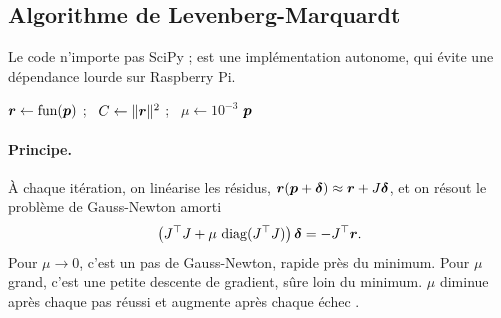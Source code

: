 \subsection{Algorithme de Levenberg-Marquardt}

Le code n'importe pas SciPy ;  est une implémentation autonome, qui évite une dépendance lourde sur Raspberry Pi.

\begin{algorithm}[H]
\caption{}
$\bm{r} \leftarrow \text{fun}(\bm{p})$ ; \ $C \leftarrow \|\bm{r}\|^2$ ; \ $\mu \leftarrow 10^{-3}$\;
\Return $\bm{p}$
\end{algorithm}

\paragraph{Principe.} À chaque itération, on linéarise les résidus, $\bm{r}(\bm{p} + \bm{\delta}) \approx \bm{r} + J\bm{\delta}$, et on résout le problème de Gauss-Newton amorti
\begin{equation}
  \big(J^{\top} J + \mu\,\operatorname{diag}(J^{\top} J)\big)\,\bm{\delta} = -J^{\top}\bm{r}.
\end{equation}
Pour $\mu \to 0$, c'est un pas de Gauss-Newton, rapide près du minimum. Pour $\mu$ grand, c'est une petite descente de gradient, sûre loin du minimum. $\mu$ diminue après chaque pas réussi et augmente après chaque échec \cite{levenberg1944,marquardt1963}.


